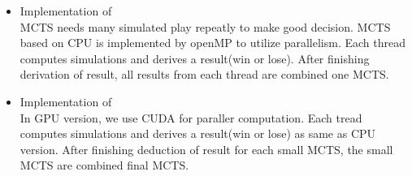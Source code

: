 \begin{itemize}
\item{Implementation of \textbf{\cpu}}\\
MCTS needs many simulated play repeatly to make good decision. 
MCTS based on CPU is implemented by openMP to utilize parallelism. 
Each thread computes simulations and derives a result(win or lose). 
After finishing derivation of result, all results from each thread are combined one MCTS.

\item{Implementation of \textbf{\gpu}}\\
In GPU version, we use CUDA for paraller computation. 
Each tread computes simulations and derives a result(win or lose) as same as CPU version. 
After finishing deduction of result for each small MCTS, the small MCTS are combined final MCTS. 

\end{itemize}
